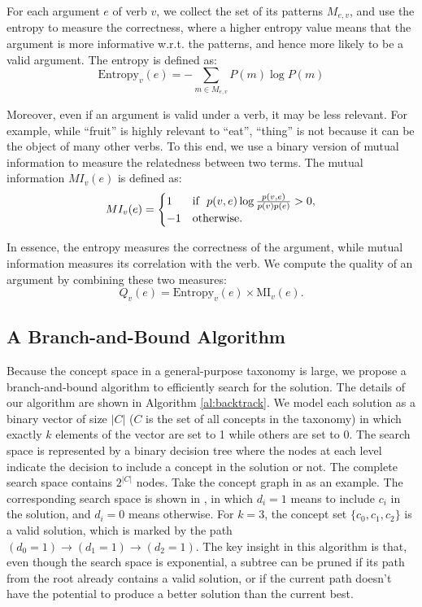 For each argument $e$ of verb $v$, we collect the set of its patterns
$M_{e,v}$, and
use the entropy to measure the correctness, where a higher
entropy value means that the argument is more informative w.r.t.
the patterns, and hence more likely to be a valid argument.
The entropy is defined as:
\begin{equation}
\text{Entropy}_v(e)=-\sum_{m\in M_{e,v}}{P(m)\log{P(m)}}
\end{equation}

Moreover, even if an argument is valid under a verb, it may be
less relevant. For example, while ``fruit'' is highly relevant to ``eat'',
``thing'' is not because it can be the object of many other verbs.
To this end, we use a binary version of mutual information to
measure the relatedness between two terms.
The mutual information $MI_v(e)$ is defined as:
\begin{equation}
MI_v(e)=
\begin{cases}
1 & \mbox{if}~\ p(v,e)\log \frac{p(v,e)}{p(v)p(e)}> 0,\\
-1 & \rm{otherwise}.
\end{cases}
\end{equation}

In essence, the entropy measures the correctness of the argument, while
mutual information measures its correlation with the verb.
We compute the quality of an argument by combining these two measures:
\begin{equation}
Q_v(e)=\text{Entropy}_v(e)\times \text{MI}_v(e).
\label{eq:qe}
\end{equation}

\subsection{A Branch-and-Bound Algorithm}
\label{sec:bb}
Because the concept space in a general-purpose taxonomy is large,
we propose a branch-and-bound algorithm to efficiently search for the solution.
The details of our algorithm are shown in Algorithm \ref{al:backtrack}.
We model each solution as a binary vector of size $|C|$ ($C$ is
the set of all concepts in the taxonomy) in which exactly
$k$ elements of the vector are set to 1 while others are set to 0.
The search space is represented by a binary decision tree
where the nodes at each level indicate the decision to include a concept in
the solution or not. The complete search space contains $2^{|C|}$ nodes.
Take the concept graph in  as an example.
The corresponding search space is shown in ,
in which $d_i=1$ means to include $c_i$ in the solution, and $d_i=0$ means
otherwise. For $k=3$, the concept set $\{c_0,c_1,c_2\}$ is
a valid solution, which is marked by the path
$(d_0=1) \rightarrow (d_1=1) \rightarrow (d_2=1)$. The key insight in this algorithm
is that, even though the search space is exponential, a subtree can be
pruned if its path from the root already contains a valid solution, or
if the current path doesn't have the potential to produce a better solution
than the current best.

